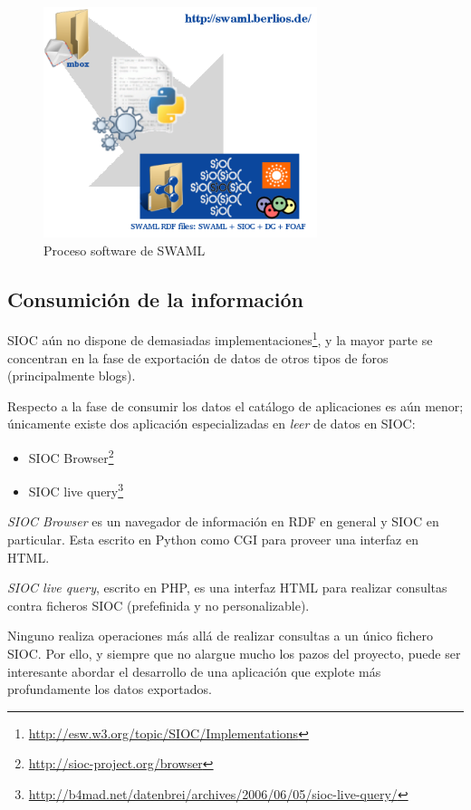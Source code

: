 \begin{figure}[H]
	\centering
	\includegraphics[width=8cm]{images/swaml-process.png}
	\caption{Proceso software de SWAML}
	\label{fig:swamlProcess}
\end{figure}


\subsection{Consumición de la información}

SIOC aún no dispone de demasiadas implementaciones\footnote{\url{http://esw.w3.org/topic/SIOC/Implementations}},
y la mayor parte se concentran en la fase de exportación de datos de otros
tipos de foros (principalmente blogs). 

Respecto a la fase de consumir los datos el catálogo de aplicaciones es aún 
menor; únicamente existe dos aplicación especializadas en \emph{leer} de datos 
en SIOC:

\begin{itemize}
 \item SIOC Browser\footnote{\url{http://sioc-project.org/browser}}
 \item SIOC live query\footnote{\url{http://b4mad.net/datenbrei/archives/2006/06/05/sioc-live-query/}}
\end{itemize}

\emph{SIOC Browser} es un navegador de información en RDF en general y SIOC en 
particular. Esta escrito en Python como CGI para proveer una interfaz en HTML.

\emph{SIOC live query}, escrito en PHP, es una interfaz HTML para realizar consultas
contra ficheros SIOC (prefefinida y no personalizable).

Ninguno realiza operaciones más allá de realizar consultas a un único fichero 
SIOC. Por ello, y siempre que no alargue mucho los pazos del proyecto, puede ser 
interesante abordar el desarrollo de una aplicación que explote más profundamente
los datos exportados.
